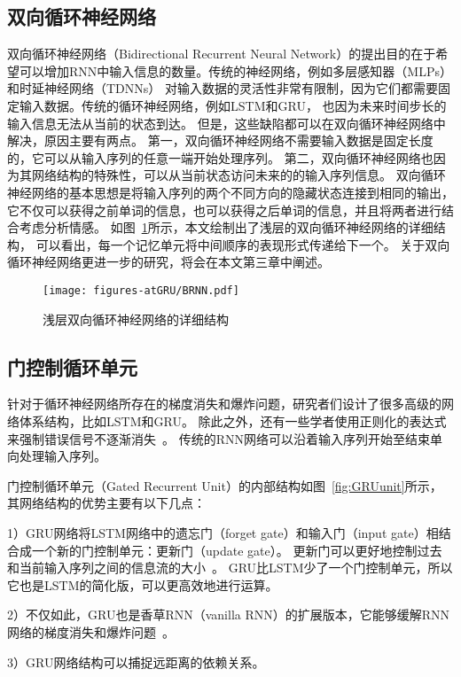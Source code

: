 \subsection{双向循环神经网络}
双向循环神经网络（Bidirectional Recurrent Neural Network）的提出目的在于希望可以增加RNN中输入信息的数量。传统的神经网络，例如多层感知器（MLPs）和时延神经网络（TDNNs）
对输入数据的灵活性非常有限制，因为它们都需要固定输入数据。传统的循环神经网络，例如LSTM和GRU，
也因为未来时间步长的输入信息无法从当前的状态到达。
但是，这些缺陷都可以在双向循环神经网络中解决，原因主要有两点。
第一，双向循环神经网络不需要输入数据是固定长度的，它可以从输入序列的任意一端开始处理序列。
第二，双向循环神经网络也因为其网络结构的特殊性，可以从当前状态访问未来的的输入序列信息。
双向循环神经网络的基本思想是将输入序列的两个不同方向的隐藏状态连接到相同的输出，
它不仅可以获得之前单词的信息，也可以获得之后单词的信息，并且将两者进行结合考虑分析情感。
如图~\ref{fig:brnn}所示，本文绘制出了浅层的双向循环神经网络的详细结构，
可以看出，每一个记忆单元将中间顺序的表现形式传递给下一个。
关于双向循环神经网络更进一步的研究，将会在本文第三章中阐述。

\begin{figure}[h!]
	\centering
	\texttt{[image: figures-atGRU/BRNN.pdf]}
	\caption{浅层双向循环神经网络的详细结构}
	\label{fig:brnn}
\end{figure}

\subsection{门控制循环单元}
针对于循环神经网络所存在的梯度消失和爆炸问题，研究者们设计了很多高级的网络体系结构，比如LSTM和GRU。
除此之外，还有一些学者使用正则化的表达式来强制错误信号不逐渐消失~。
传统的RNN网络可以沿着输入序列开始至结束单向处理输入序列。

门控制循环单元（Gated Recurrent Unit）的内部结构如图~\ref{fig:GRUunit}所示，其网络结构的优势主要有以下几点：

1）GRU网络将LSTM网络中的遗忘门（forget gate）和输入门（input gate）相结合成一个新的门控制单元：更新门（update gate）。
更新门可以更好地控制过去和当前输入序列之间的信息流的大小~。
GRU比LSTM少了一个门控制单元，所以它也是LSTM的简化版，可以更高效地进行运算。

2）不仅如此，GRU也是香草RNN（vanilla RNN）的扩展版本，它能够缓解RNN网络的梯度消失和爆炸问题~。

3）GRU网络结构可以捕捉远距离的依赖关系。

